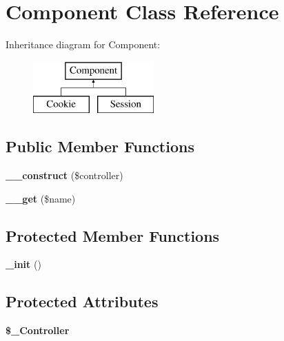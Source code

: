 \hypertarget{classComponent}{
\section{Component Class Reference}
\label{classComponent}
}
Inheritance diagram for Component:\begin{figure}[H]
\begin{center}
\leavevmode
\includegraphics[height=2.000000cm]{classComponent}
\end{center}
\end{figure}
\subsection*{Public Member Functions}
\begin{DoxyCompactItemize}
\item 
\hypertarget{classComponent_aaa6259b967067c4616a8b33a92bbb616}{
{\bfseries \_\-\_\-construct} (\$controller)}
\label{classComponent_aaa6259b967067c4616a8b33a92bbb616}

\item 
\hypertarget{classComponent_ae72a2aff44cb477971a8649abba407cd}{
{\bfseries \_\-\_\-get} (\$name)}
\label{classComponent_ae72a2aff44cb477971a8649abba407cd}

\end{DoxyCompactItemize}
\subsection*{Protected Member Functions}
\begin{DoxyCompactItemize}
\item 
\hypertarget{classComponent_ae69207eea0ccf6cc855e74fa05b6db17}{
{\bfseries \_\-init} ()}
\label{classComponent_ae69207eea0ccf6cc855e74fa05b6db17}

\end{DoxyCompactItemize}
\subsection*{Protected Attributes}
\begin{DoxyCompactItemize}
\item 
\hypertarget{classComponent_a560d57b5dbdc6a452d39efd2a8effc49}{
{\bfseries \$\_\-Controller}}
\label{classComponent_a560d57b5dbdc6a452d39efd2a8effc49}

\end{DoxyCompactItemize}


